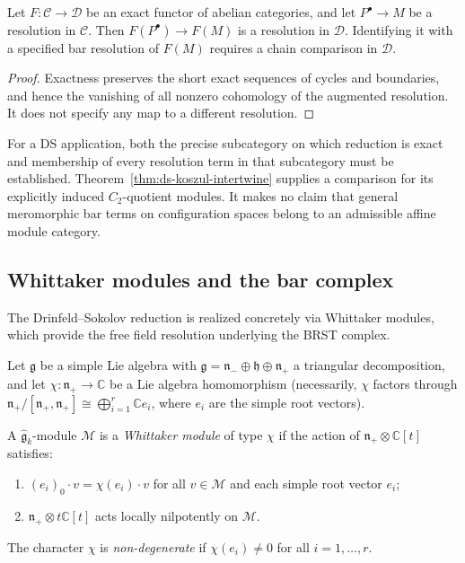 \begin{proposition}
\label{prop:ds-admissible}
Let $F:\mathcal C\to\mathcal D$ be an exact functor of abelian categories, and let $P^\bullet\to M$ be a resolution in $\mathcal C$.
Then $F(P^\bullet)\to F(M)$ is a resolution in $\mathcal D$.
Identifying it with a specified bar resolution of $F(M)$ requires a chain comparison in $\mathcal D$.
\end{proposition}
\begin{proof}
Exactness preserves the short exact sequences of cycles and boundaries, and hence the vanishing of all nonzero cohomology of the augmented resolution.
It does not specify any map to a different resolution.
\end{proof}
For a DS application, both the precise subcategory on which reduction is exact and membership of every resolution term in that subcategory must be established.
Theorem~\ref{thm:ds-koszul-intertwine} supplies a comparison for its explicitly induced $C_2$-quotient modules.
It makes no claim that general meromorphic bar terms on configuration spaces belong to an admissible affine module category.

\subsection{Whittaker modules and the bar complex}
\label{sec:whittaker-modules}

The Drinfeld--Sokolov reduction is realized concretely via
Whittaker modules, which provide the free field resolution
underlying the BRST complex.

\begin{definition}
\label{def:whittaker-module}
Let $\mathfrak{g}$ be a simple Lie algebra with
$\mathfrak{g} = \mathfrak{n}_- \oplus \mathfrak{h} \oplus
\mathfrak{n}_+$ a triangular decomposition, and let
$\chi \colon \mathfrak{n}_+ \to \mathbb{C}$ be a Lie algebra
homomorphism (necessarily, $\chi$ factors through
$\mathfrak{n}_+ / [\mathfrak{n}_+, \mathfrak{n}_+] \cong
\bigoplus_{i=1}^r \mathbb{C} e_i$, where $e_i$ are the
simple root vectors).

A $\widehat{\mathfrak{g}}_k$-module $\mathcal{M}$ is a
\emph{Whittaker module} of type $\chi$ if the action of
$\mathfrak{n}_+ \otimes \mathbb{C}[t]$ satisfies:
\begin{enumerate}[label=\textup{(\roman*)}]
\item $(e_i)_0 \cdot v = \chi(e_i) \cdot v$ for all
  $v \in \mathcal{M}$ and each simple root vector $e_i$;
\item $\mathfrak{n}_+ \otimes t\mathbb{C}[t]$ acts locally
  nilpotently on $\mathcal{M}$.
\end{enumerate}
The character $\chi$ is \emph{non-degenerate} if
$\chi(e_i) \neq 0$ for all $i = 1, \ldots, r$.
\end{definition}


